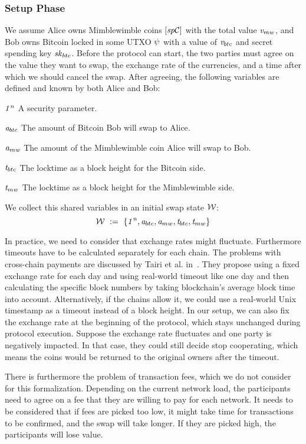 \subsubsection{Setup Phase}\label{subsec:atom:setup}

We assume Alice owns Mimblewimble coins $[\mathit{sp}\mathcal{C}]$ with the total value $\mathit{v}_{mw}$, and Bob owns
Bitcoin locked in some UTXO $\psi$ with a value of $\mathit{v}_{btc}$ and secret spending key $\mathit{sk}_{btc}$.
Before the protocol can start, the two parties must agree on the value they want to swap, the exchange rate of the currencies, and a time after which we should cancel the swap.
After agreeing, the following variables are defined and known by both Alice and Bob:
\begin{asparaitem}
    \item $\mathit{1^n}$ A security parameter.
    \item $\mathit{a}_{btc}$ The amount of Bitcoin Bob will swap to Alice.
    \item $\mathit{a}_{mw}$ The amount of the Mimblewimble coin Alice will swap to Bob.
    \item $\mathit{t}_{btc}$ The locktime as a block height for the Bitcoin side.
    \item $\mathit{t}_{mw}$ The locktime as a block height for the Mimblewimble side.
\end{asparaitem}
We collect this shared variables in an initial swap state $\mathcal{W}$:
\[ \mathcal{W} ~:=~ \{ \mathit{1^n}, \mathit{a}_{btc}, \mathit{a}_{mw}, \mathit{t}_{btc}, \mathit{t}_{mw} \} \]

In practice, we need to consider that exchange rates might fluctuate.
Furthermore timeouts have to be calculated separately for each chain.
The problems with cross-chain payments are discussed by Tairi et al. in~\cite{tairi2019a2l}.
They propose using a fixed exchange rate for each day and using real-world timeout like one day and then calculating the specific block numbers by taking blockchain's average block time into account.
Alternatively, if the chains allow it, we could use a real-world Unix timestamp as a timeout instead of a block height.
In our setup, we can also fix the exchange rate at the beginning of the protocol, which stays unchanged during protocol execution.
Suppose the exchange rate fluctuates and one party is negatively impacted.
In that case, they could still decide stop cooperating, which means the coins would be returned to the original owners after the timeout.

There is furthermore the problem of transaction fees, which we do not consider for this formalization.
Depending on the current network load, the participants need to agree on a fee that they are willing to pay for each network.
It needs to be considered that if fees are picked too low, it might take time for transactions to be confirmed, and the swap will take longer.
If they are picked high, the participants will lose value.

